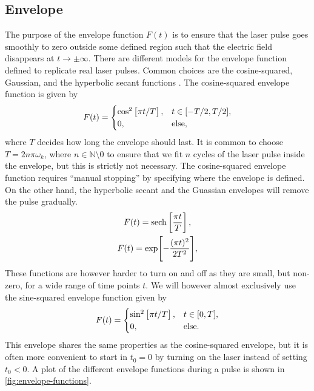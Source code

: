         \subsection{Envelope}
            The purpose of the envelope function $F(t)$ is to ensure that the
            laser pulse goes smoothly to zero outside some defined region such
            that the electric field disappears at $t \to \pm \infty$.
            There are different models for the envelope function defined to
            replicate real laser pulses.
            Common choices are the cosine-squared, Gaussian, and the hyperbolic
            secant functions \cite{joachain2012atoms}.
            The cosine-squared envelope function is given by
            \begin{gather}
                F(t) = \begin{cases}
                    \cos^2\left[ 
                        \pi t / T
                     \right], & t \in [-T / 2, T / 2], \\
                    0, & \text{else},
                \end{cases}
            \end{gather}
            where $T$ decides how long the envelope should last.
            It is common to choose $T = 2n\pi\omega_k$, where $n \in
            \mathbb{N}\setminus{0}$ to ensure that we fit $n$ cycles of the
            laser pulse inside the envelope, but this is strictly not necessary.
            The cosine-squared envelope function requires ``manual stopping'' by
            specifying where the envelope is defined.
            On the other hand, the hyperbolic secant and the Guassian envelopes
            will remove the pulse gradually.
            \begin{gather}
                F(t) = \sech\brak{
                    \frac{\pi t}{T}
                }, \\
                F(t) = \exp[
                    -\frac{(\pi t)^2}{2T^2}
                ],
            \end{gather}
            These functions are however harder to turn on and off as they are
            small, but non-zero, for a wide range of time points $t$.
            We will however almost exclusively use the sine-squared envelope
            function given by
            \begin{align}
                F(t) = \begin{cases}
                    \sin^2\left[ 
                        \pi t / T
                     \right], & t \in [0, T], \\
                    0, & \text{else}.
                \end{cases}
            \end{align}
            This envelope shares the same properties as the cosine-squared
            envelope, but it is often more convenient to start in $t_0 = 0$ by
            turning on the laser instead of setting $t_0 < 0$.
            A plot of the different envelope functions during a pulse is shown
            in \autoref{fig:envelope-functions}.

